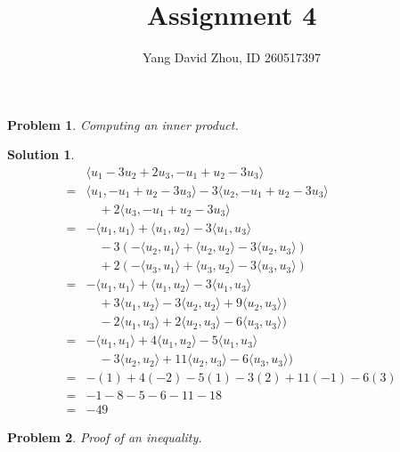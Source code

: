 \documentclass{article}
\newtheorem{problem}{Problem}
\theoremstyle{definition}
\newtheorem*{solution}{Solution}
\theoremstyle{remark}
\begin{document}
 \title{Assignment 4} 

\author{Yang David Zhou, ID 260517397} 
\date{}
\maketitle

\begin{problem} Computing an inner product.

\end{problem}

\begin{solution}

\begin{align*}
& \langle u_1-3u_2+2u_3, -u_1+u_2-3u_3 \rangle \\
= & \langle u_1, -u_1+u_2-3u_3\rangle -3 \langle u_2, -u_1+u_2-3u_3\rangle \\
  & \quad +2 \langle u_3, -u_1+u_2-3u_3\rangle \\
= & -\langle u_1,u_1 \rangle + \langle u_1, u_2 \rangle -3 \langle u_1, u_3 \rangle \\
  & \quad -3 (-\langle u_2,u_1 \rangle + \langle u_2, u_2 \rangle -3 \langle u_2, u_3 \rangle) \\
  & \quad +2 (-\langle u_3,u_1 \rangle + \langle u_3, u_2 \rangle -3 \langle u_3, u_3 \rangle) \\
= & -\langle u_1,u_1 \rangle + \langle u_1, u_2 \rangle -3 \langle u_1, u_3 \rangle \\
  & \quad +3 \langle u_1,u_2 \rangle -3 \langle u_2, u_2 \rangle +9 \langle u_2, u_3 \rangle) \\
  & \quad -2 \langle u_1,u_3 \rangle +2 \langle u_2, u_3 \rangle -6 \langle u_3, u_3 \rangle) \\
= & -\langle u_1,u_1 \rangle +4 \langle u_1, u_2 \rangle -5 \langle u_1, u_3 \rangle \\
  & \quad -3 \langle u_2,u_2 \rangle +11 \langle u_2, u_3 \rangle -6 \langle u_3, u_3 \rangle) \\
= & -(1)+4(-2)-5(1)-3(2)+11(-1)-6(3) \\
= & -1-8-5-6-11-18 \\
= & \boxed{-49}
\end{align*}

\end{solution}

\begin{problem} Proof of an inequality.

\end{problem}
\end{document}
